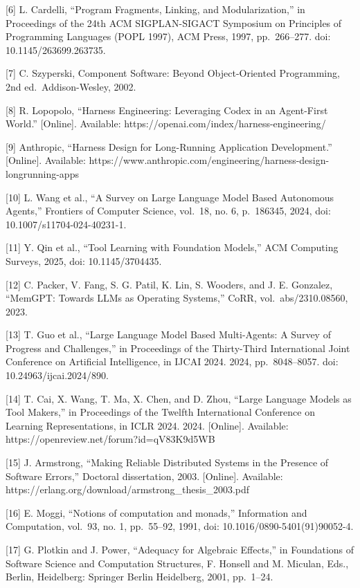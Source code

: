 {[}6{]} L. Cardelli, ``Program Fragments, Linking, and Modularization,'' in Proceedings
of the 24th ACM SIGPLAN-SIGACT Symposium on Principles of Programming Languages
(POPL 1997), ACM Press, 1997, pp.~266--277. doi: 10.1145/263699.263735.

{[}7{]} C. Szyperski, Component Software: Beyond Object-Oriented Programming, 2nd
ed.~Addison-Wesley, 2002.

{[}8{]} R. Lopopolo, ``Harness Engineering: Leveraging Codex in an Agent-First
World.'' {[}Online{]}. Available: https://openai.com/index/harness-engineering/

{[}9{]} Anthropic, ``Harness Design for Long-Running Application Development.''
{[}Online{]}. Available: https://www.anthropic.com/engineering/harness-design-longrunning-apps

{[}10{]} L. Wang et al., ``A Survey on Large Language Model Based Autonomous
Agents,'' Frontiers of Computer Science, vol.~18, no. 6, p.~186345, 2024, doi:
10.1007/s11704-024-40231-1.

{[}11{]} Y. Qin et al., ``Tool Learning with Foundation Models,'' ACM Computing
Surveys, 2025, doi: 10.1145/3704435.

{[}12{]} C. Packer, V. Fang, S. G. Patil, K. Lin, S. Wooders, and J. E. Gonzalez,
``MemGPT: Towards LLMs as Operating Systems,'' CoRR, vol.~abs/2310.08560, 2023.

{[}13{]} T. Guo et al., ``Large Language Model Based Multi-Agents: A Survey of
Progress and Challenges,'' in Proceedings of the Thirty-Third International Joint
Conference on Artificial Intelligence, in IJCAI 2024. 2024, pp.~8048--8057. doi:
10.24963/ijcai.2024/890.

{[}14{]} T. Cai, X. Wang, T. Ma, X. Chen, and D. Zhou, ``Large Language Models as
Tool Makers,'' in Proceedings of the Twelfth International Conference on Learning
Representations, in ICLR 2024. 2024. {[}Online{]}. Available:
https://openreview.net/forum?id=qV83K9d5WB

{[}15{]} J. Armstrong, ``Making Reliable Distributed Systems in the Presence of
Software Errors,'' Doctoral dissertation, 2003. {[}Online{]}. Available:
https://erlang.org/download/armstrong\_thesis\_2003.pdf

{[}16{]} E. Moggi, ``Notions of computation and monads,'' Information and
Computation, vol.~93, no. 1, pp.~55--92, 1991, doi: 10.1016/0890-5401(91)90052-4.

{[}17{]} G. Plotkin and J. Power, ``Adequacy for Algebraic Effects,'' in Foundations of
Software Science and Computation Structures, F. Honsell and M. Miculan, Eds.,
Berlin, Heidelberg: Springer Berlin Heidelberg, 2001, pp.~1--24.

